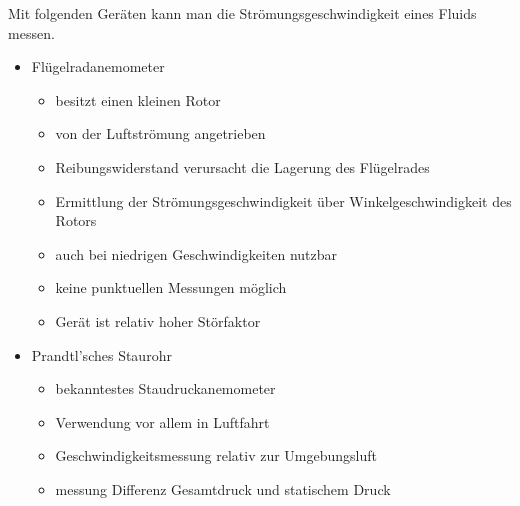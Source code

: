 \documentclass[a4paper,10pt]{scrartcl}
\begin{document}
		Mit folgenden Geräten kann man die Strömungsgeschwindigkeit eines Fluids messen.
		\begin{itemize}
			\item Flügelradanemometer
			\begin{itemize}
				\item besitzt einen kleinen Rotor
				\item von der Luftströmung
				angetrieben
				\item Reibungswiderstand verursacht die Lagerung
				des Flügelrades
				\item Ermittlung der Strömungsgeschwindigkeit über Winkelgeschwindigkeit des Rotors
				\item auch bei niedrigen Geschwindigkeiten nutzbar
				\item keine punktuellen Messungen möglich
				\item Gerät ist relativ hoher Störfaktor
			\end{itemize}
			\item Prandtl'sches Staurohr
			\begin{itemize}
				\item bekanntestes Staudruckanemometer
				\item Verwendung vor allem in Luftfahrt
				\item Geschwindigkeitsmessung relativ zur Umgebungsluft
				\item messung Differenz Gesamtdruck und statischem Druck
			\end{itemize}
		\end{itemize}
	
\end{document}
